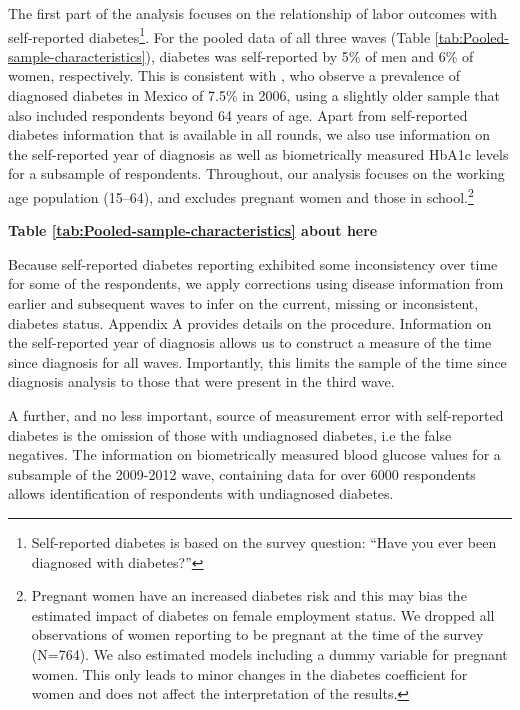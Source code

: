 \documentclass[12pt,english]{article}
\begin{document}
The first part of the analysis focuses on the relationship of labor outcomes with self-reported diabetes\footnote{Self-reported diabetes is based on the survey question: “Have you ever been diagnosed with diabetes?”}. For the pooled data of all three waves (Table \ref{tab:Pooled-sample-characteristics}), diabetes was self-reported by 5\% of men and 6\% of women, respectively. This is consistent with \textcite{Barquera2013}, who observe a prevalence of diagnosed diabetes in Mexico of 7.5\% in 2006, using a slightly older sample that also included respondents beyond 64 years of age. Apart from self-reported diabetes information that is available in all rounds, we also use information on the self-reported year of diagnosis as well as biometrically measured \ac{HbA1c} levels for a subsample of respondents. Throughout, our analysis focuses on the working age population (15–64), and excludes pregnant women and those in school.\footnote{Pregnant women have an increased diabetes risk and this may bias the estimated impact of diabetes on female employment status. We dropped all observations of women reporting to be pregnant at the time of the survey (N=764). We also estimated models including a dummy variable for pregnant women. This only leads to minor changes in the diabetes coefficient for women and does not affect the interpretation of the results.}

\begin{center}
	\textbf{Table \ref{tab:Pooled-sample-characteristics} about here}
\end{center}

Because self-reported diabetes reporting exhibited some inconsistency over time for some of the respondents, we apply corrections using disease information from earlier and subsequent waves to infer on the current, missing or inconsistent, diabetes status. Appendix A provides details on the procedure. Information on the self-reported year of diagnosis allows us to construct a measure of the time since diagnosis for all waves. Importantly, this limits the sample of the time since diagnosis analysis to those that were present in the third wave. 

A further, and no less important, source of measurement error with self-reported diabetes is the omission of those with undiagnosed diabetes, i.e the false negatives. The information on biometrically measured blood glucose values for a subsample of the 2009-2012 wave, containing data for over 6000 respondents allows identification of respondents with undiagnosed diabetes. 
\end{document}
